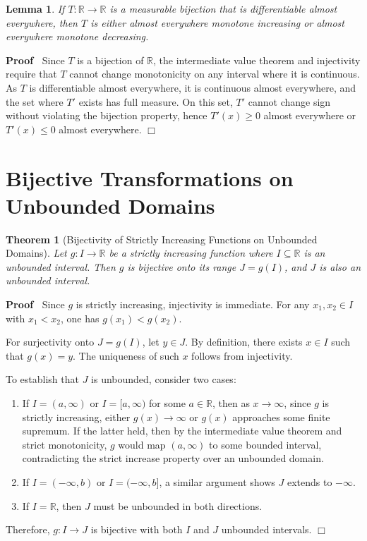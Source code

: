 \documentclass{article}
\newenvironment{proof}{\noindent\textbf{Proof\ }}{\hspace*{\fill}$\Box$\medskip}
\newtheorem{lemma}{Lemma}
\newtheorem{theorem}{Theorem}
\begin{document}
\begin{lemma}
  \label{lem:monotone}If $T : \mathbb{R} \to \mathbb{R}$ is a measurable
  bijection that is differentiable almost everywhere, then $T$ is either
  almost everywhere monotone increasing or almost everywhere monotone
  decreasing.
\end{lemma}

\begin{proof}
  Since $T$ is a bijection of $\mathbb{R}$, the intermediate value theorem and
  injectivity require that $T$ cannot change monotonicity on any interval
  where it is continuous. As $T$ is differentiable almost everywhere, it is
  continuous almost everywhere, and the set where $T'$ exists has full
  measure. On this set, $T'$ cannot change sign without violating the
  bijection property, hence $T' (x) \geq 0$ almost everywhere or $T' (x) \leq
  0$ almost everywhere.
\end{proof}

\section{Bijective Transformations on Unbounded Domains}

\begin{theorem}[Bijectivity of Strictly Increasing Functions on Unbounded
Domains]
  \label{thm:bijective_unbounded}Let $g : I \to \mathbb{R}$ be a strictly
  increasing function where $I \subseteq \mathbb{R}$ is an unbounded interval.
  Then $g$ is bijective onto its range $J = g (I)$, and $J$ is also an
  unbounded interval.
\end{theorem}

\begin{proof}
  Since $g$ is strictly increasing, injectivity is immediate. For any $x_1,
  x_2 \in I$ with $x_1 < x_2$, one has $g (x_1) < g (x_2)$.
  
  For surjectivity onto $J = g (I)$, let $y \in J$. By definition, there
  exists $x \in I$ such that $g (x) = y$. The uniqueness of such $x$ follows
  from injectivity.
  
  To establish that $J$ is unbounded, consider two cases:
  \begin{enumerate}
    \item If $I = (a, \infty)$ or $I = [a, \infty)$ for some $a \in
    \mathbb{R}$, then as $x \to \infty$, since $g$ is strictly increasing,
    either $g (x) \to \infty$ or $g (x)$ approaches some finite supremum. If
    the latter held, then by the intermediate value theorem and strict
    monotonicity, $g$ would map $(a, \infty)$ to some bounded interval,
    contradicting the strict increase property over an unbounded domain.
    
    \item If $I = (- \infty, b)$ or $I = (- \infty, b]$, a similar argument
    shows $J$ extends to $- \infty$.
    
    \item If $I =\mathbb{R}$, then $J$ must be unbounded in both directions.
  \end{enumerate}
  Therefore, $g : I \to J$ is bijective with both $I$ and $J$ unbounded
  intervals.
\end{proof}
\end{document}

